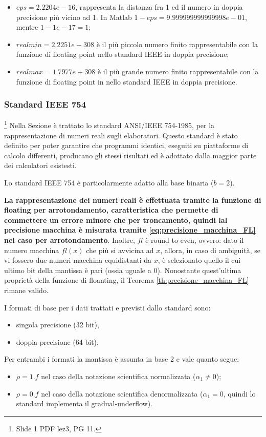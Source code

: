 \begin{itemize}
	\item $eps =  2.2204e-16$, rappresenta la distanza fra 1 ed il numero in doppia precisione più vicino ad 1. In Matlab $1 - eps = 9.999999999999998e-01$, mentre $1 - 1e-17 = 1$;
	\item $realmin = 2.2251e-308$ è il più piccolo numero finito rappresentabile con la funzione di floating point nello standard IEEE in doppia precisione;
	\item $realmax = 1.7977e+308$ è il più grande numero finito rappresentabile con la funzione di floating point in nello standard IEEE in doppia precisione.
\end{itemize}

\subsubsection{Standard IEEE 754}\footnote{Slide 1 PDF lez3, PG 11.}
Nella Sezione è trattato lo standard ANSI/IEEE 754-1985, per la rappresentazione di numeri reali sugli elaboratori. Questo standard è stato definito per poter garantire che programmi identici, eseguiti su piattaforme di calcolo differenti, producano gli stessi risultati ed è adottato dalla maggior parte dei calcolatori esistesti. 

Lo standard IEEE 754 è particolarmente adatto alla base binaria ($b=2$).

\textbf{La rappresentazione dei numeri reali è effettuata tramite la funzione di floating per arrotondamento, caratteristica che permette di commettere un errore minore che per troncamento, quindi lal precisione macchina è misurata tramite \ref{eq:precisione_macchina_FL} nel caso per arrotondamento}. Inoltre, $fl$ è round to even, ovvero: dato il numero macchina $fl(x)$ che più si avvicina ad $x$, allora, in caso di ambiguità, se vi fossero due numeri macchina equidistanti da $x$, è selezionato quello il cui ultimo bit della mantissa è pari (ossia uguale a 0). Nonostante quest'ultima proprietà della funzione di floanting, il Teorema \ref{th:precisione_macchina_FL} rimane valido. 

I formati di base per i dati trattati e previsti dallo standard sono:
\begin{itemize}
	\item singola precisione (32 bit),
	\item doppia precisione (64 bit).
\end{itemize}

Per entrambi i formati la mantissa è assunta in base 2 e vale quanto segue:
\begin{itemize}
	\item $\rho=1.f$ nel caso della notazione scientifica normalizzata ($\alpha_1\neq 0$);
	\item $\rho=0.f$ nel caso della notazione scientifica denormalizzata ($\alpha_1=0$, quindi lo standard implementa il gradual-underflow).
\end{itemize}

